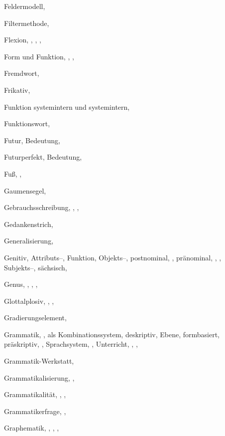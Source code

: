 \begin{theindex}
  \indexspace

  \item Feldermodell, 
  \item Filtermethode, 
  \item Flexion, , , , 
  \item Form und Funktion, , , 
  \item Fremdwort, 
  \item Frikativ, 
  \item Funktion
    \subitem systemintern und systemintern, 
  \item Funktionswort, 
  \item Futur, 
    \subitem Bedeutung, 
  \item Futurperfekt, 
    \subitem Bedeutung, 
  \item Fuß, , 

  \indexspace

  \item Gaumensegel, 
  \item Gebrauchsschreibung, , , 
  \item Gedankenstrich, 
  \item Generalisierung, 
  \item Genitiv, 
    \subitem Attributs--, 
    \subitem Funktion, 
    \subitem Objekts--, 
    \subitem postnominal, , 
    \subitem pränominal, , , 
    \subitem Subjekts--, 
    \subitem sächsisch, 
  \item Genus, , , , 
  \item Glottalplosiv, , , 
  \item Gradierungselement, 
  \item Grammatik, , 
    \subitem als Kombinationssystem, 
    \subitem deskriptiv, 
    \subitem Ebene, 
    \subitem formbasiert, 
    \subitem präskriptiv, , 
    \subitem Sprachsystem, , 
    \subitem Unterricht, , , 
  \item Grammatik-Werkstatt, 
  \item Grammatikalisierung, , 
  \item Grammatikalität, , , 
  \item Grammatikerfrage, , 
  \item Graphematik, , , , 


\end{theindex}
